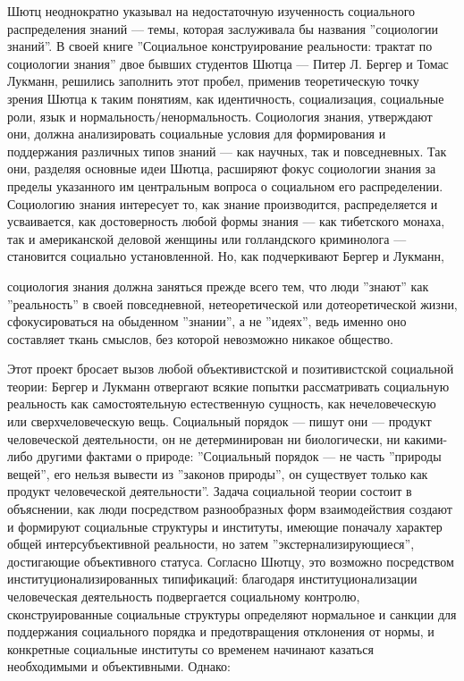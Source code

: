 \documentclass[11pt]{book}
\begin{document}
Шютц неоднократно указывал на недостаточную изученность социального распределения знаний --- темы, которая заслуживала бы названия ''социологии знаний''. В своей книге ''Социальное конструирование реальности: трактат по социологии знания'' двое бывших студентов Шютца --- Питер Л. Бергер и Томас Лукманн, решились заполнить этот пробел, применив теоретическую точку зрения Шютца к таким понятиям, как идентичность, социализация, социальные роли, язык и нормальность/ненормальность. Социология знания, утверждают они, должна анализировать социальные условия для формирования и поддержания различных типов знаний --- как научных, так и повседневных. Так они, разделяя основные идеи Шютца, расширяют фокус социологии знания за пределы указанного им центральным вопроса о социальном его распределении. Социологию знания интересует то, как знание производится, распределяется и усваивается, как достоверность любой формы знания --- как тибетского монаха, так и американской деловой женщины или голландского криминолога --- становится социально установленной. Но, как подчеркивают Бергер и Лукманн,

\smallskip
{}\relax
{}\relax

социология знания должна заняться прежде всего тем, что люди ''знают'' как ''реальность'' в своей повседневной, нетеоретической или дотеоретической жизни, сфокусироваться на обыденном ''знании'', а не ''идеях'', ведь именно оно составляет ткань смыслов, без которой невозможно никакое общество.

\relax
{}\relax
\smallskip

Этот проект бросает вызов любой объективистской и позитивистской социальной теории: Бергер и Лукманн отвергают всякие попытки рассматривать социальную реальность как самостоятельную естественную сущность, как нечеловеческую или сверхчеловеческую вещь. Социальный порядок --- пишут они --- продукт человеческой деятельности, он не детерминирован ни биологически, ни какими-либо другими фактами о природе: ''Социальный порядок --- не часть ''природы вещей'', его нельзя вывести из ''законов природы'', он существует только как продукт человеческой деятельности''. Задача социальной теории состоит в объяснении, как люди посредством разнообразных форм взаимодействия создают и формируют социальные структуры и институты, имеющие поначалу характер общей интерсубъективной реальности, но затем ''экстернализирующиеся'', достигающие объективного статуса. Согласно Шютцу, это возможно посредством институционализированных типификаций: благодаря институционализации человеческая деятельность подвергается социальному контролю, сконструированные социальные структуры определяют нормальное и санкции для поддержания социального порядка и предотвращения отклонения от нормы, и конкретные социальные институты со временем начинают казаться необходимыми и объективными. Однако:
\end{document}
